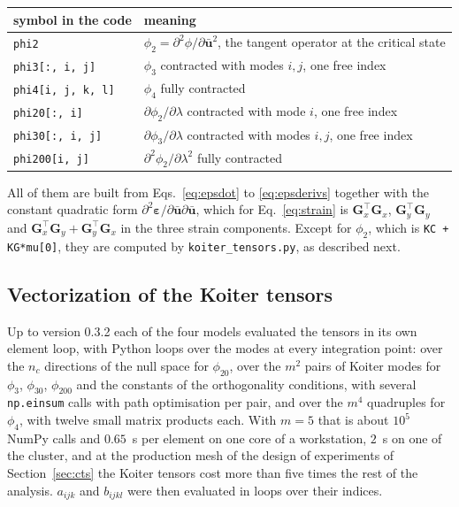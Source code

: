 \documentclass[11pt,a4paper]{article}
\begin{document}
\begin{center}
\begin{tabular}{ll}
\toprule
symbol in the code & meaning \\
\midrule
\texttt{phi2}                & $\phi_2 = \partial^2\phi/\partial\boldsymbol{\bar{u}}^2$, the tangent operator at the critical state \\
\texttt{phi3[:, i, j]}       & $\phi_3$ contracted with modes $i,j$, one free index \\
\texttt{phi4[i, j, k, l]}    & $\phi_4$ fully contracted \\
\texttt{phi20[:, i]}         & $\partial\phi_2/\partial\lambda$ contracted with mode $i$, one free index \\
\texttt{phi30[:, i, j]}      & $\partial\phi_3/\partial\lambda$ contracted with modes $i,j$, one free index \\
\texttt{phi200[i, j]}        & $\partial^2\phi_2/\partial\lambda^2$ fully contracted \\
\bottomrule
\end{tabular}
\end{center}

All of them are built from Eqs.~\ref{eq:epsdot} to \ref{eq:epsderivs} together
with the constant quadratic form
$\partial^2\boldsymbol{\varepsilon}/
\partial\boldsymbol{\bar{u}}\partial\boldsymbol{\bar{u}}$, which for
Eq.~\ref{eq:strain} is $\boldsymbol{G}_x^\top\boldsymbol{G}_x$,
$\boldsymbol{G}_y^\top\boldsymbol{G}_y$ and
$\boldsymbol{G}_x^\top\boldsymbol{G}_y +
\boldsymbol{G}_y^\top\boldsymbol{G}_x$ in the three strain components.
Except for $\phi_2$, which is \texttt{KC + KG*mu[0]}, they are computed by
\texttt{koiter\_tensors.py}, as described next.

\subsection{Vectorization of the Koiter tensors}
\label{sec:vectorization}

Up to version 0.3.2 each of the four models evaluated the tensors in its own
element loop, with Python loops over the modes at every integration point:
over the $n_c$ directions of the null space for $\phi_{20}$, over the $m^2$
pairs of Koiter modes for $\phi_3$, $\phi_{30}$, $\phi_{200}$ and the
constants of the orthogonality conditions, with several \texttt{np.einsum}
calls with path optimisation per pair, and over the $m^4$ quadruples for
$\phi_4$, with twelve small matrix products each.  With $m = 5$ that is about
$10^5$ NumPy calls and $0.65$~s per element on one core of a workstation,
$2$~s on one of the cluster, and at the production mesh of the design of
experiments of Section~\ref{sec:cts} the Koiter tensors cost more than five
times the rest of the analysis.  $a_{ijk}$ and $b_{ijkl}$ were then evaluated
in loops over their indices.
\end{document}
